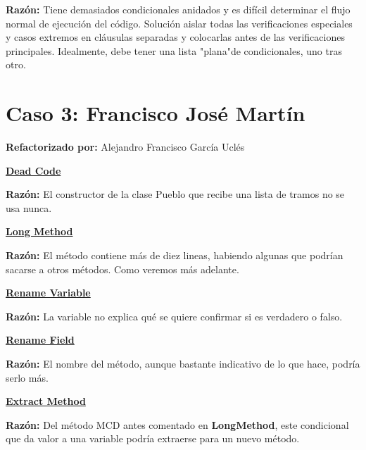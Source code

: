 \documentclass[11pt,a4paper,oneside]{book}
\begin{document}
   \textbf{Razón:} Tiene demasiados condicionales anidados y es difícil determinar el flujo normal de ejecución del código. Solución aislar todas las verificaciones especiales y casos extremos en cláusulas separadas y colocarlas antes de las verificaciones principales. Idealmente, debe tener una lista "plana"de condicionales, uno tras otro.
   
   

   \newline

   

\chapter {Caso 3: Francisco José Martín}
 \textbf{Refactorizado por:} Alejandro Francisco García Uclés \newline

    \hyperref[deadcode]{\textbf{Dead Code}}
    
    \textbf{Razón:} El constructor de la clase Pueblo que recibe una lista de tramos no se usa nunca.
    
    
    
    \hyperref[longmethod]{\textbf{Long Method}}
    
    \textbf{Razón:} El método contiene más de diez lineas, habiendo algunas que podrían sacarse a otros métodos. Como veremos más adelante.
    
    
    
    \hyperref[renamevariable]{\textbf{Rename Variable}}
    
    \textbf{Razón:} La variable no explica qué se quiere confirmar si es verdadero o falso.
    
    
    
    \hyperref[renamefield]{\textbf{Rename Field}}
    
    \textbf{Razón:} El nombre del método, aunque bastante indicativo de lo que hace, podría serlo más.
    
    
    
    \hyperref[extractmethod]{\textbf{Extract Method}}
    
    \textbf{Razón:} Del método MCD antes comentado en \textbf{LongMethod}, este condicional que da valor a una variable podría extraerse para un nuevo método.
    
\end{document}
